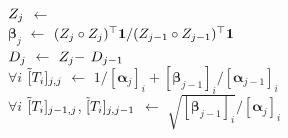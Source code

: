 \begin{algorithm2e}[p!]
{      \\
      {\color{\colormat} }
      {\color{\colormat} $Z_{j}$ $\gets$ }
      \\
      {\color{\colormat} $\boldsymbol \beta_j$ $\gets$ ${( Z_{j} \circ Z_{j} )^\top \mathbf 1}/{( Z_{j-1} \circ Z_{j-1} )^\top \mathbf 1}$}
      \\
      {\color{\colormat} $D_{j}$ $\gets$ $Z_{j} -$  $D_{j-1}$}
      \\
      {\color{\colornew} $\forall i$ \: $\tilde [T_{i}]_{j,j}$ $\gets$ $1/[\boldsymbol \alpha_{j}]_{i} + [\boldsymbol \beta_{j-1}]_{i}/[\boldsymbol \alpha_{j-1}]_{i}$}
      \\
      {\color{\colornew} $\forall i$ \: $\tilde [T_{i}]_{j-1,j}$, $\tilde [T_{i}]_{j,j-1}$ $\gets$ $\sqrt{[\boldsymbol \beta_{j-1}]_{i}}/[\boldsymbol \alpha_{j}]_{i}$}
    }
\end{algorithm2e}
